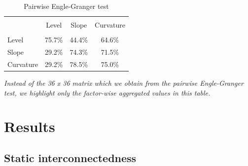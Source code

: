 \documentclass[12pt,bibliography=totoc]{article}
\begin{document}
\begin{table}[H]


\centering%
\begin{tabular}{l | ccc}%
\hline\hline \\ [-1.5ex]                         %

	&	Level 	&	Slope	&	Curvature	\\
\hline \\ [-1.5ex]  
Level	&	75.7\%	&	44.4\%	&	64.6\%	\\
Slope	&	29.2\%	&	74.3\%	&	71.5\%	\\
Curvature	&	29.2\%	&	78.5\%	&	75.0\%	\\


\hline            





\end{tabular}
\label{table:nonlin}%
\caption{Pairwise Engle-Granger test} %
\end{table}

    \begin{tablenotes}
      \small
     \item \centering \textit{Instead of the 36 x 36 matrix which we obtain from the pairwise Engle-Granger test, we highlight only the factor-wise aggregated values in this table.}
    \end{tablenotes}




\section{Results}

\subsection{Static interconnectedness}

\end{document}
